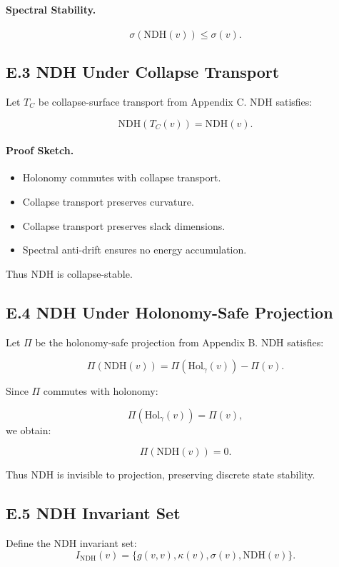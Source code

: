 \paragraph{Spectral Stability.}
\[
\sigma(\mathrm{NDH}(v)) \le \sigma(v).
\]

\subsection{E.3 NDH Under Collapse Transport}

Let $T_C$ be collapse-surface transport from Appendix C. NDH satisfies:

\[
\mathrm{NDH}(T_C(v)) = \mathrm{NDH}(v).
\]

\paragraph{Proof Sketch.}
\begin{itemize}
    \item Holonomy commutes with collapse transport.
    \item Collapse transport preserves curvature.
    \item Collapse transport preserves slack dimensions.
    \item Spectral anti-drift ensures no energy accumulation.
\end{itemize}

Thus NDH is collapse-stable.

\subsection{E.4 NDH Under Holonomy-Safe Projection}

Let $\Pi$ be the holonomy-safe projection from Appendix B. NDH satisfies:

\[
\Pi(\mathrm{NDH}(v)) = \Pi(\mathrm{Hol}_\gamma(v)) - \Pi(v).
\]

Since $\Pi$ commutes with holonomy:

\[
\Pi(\mathrm{Hol}_\gamma(v)) = \Pi(v),
\]
we obtain:

\[
\Pi(\mathrm{NDH}(v)) = 0.
\]

Thus NDH is invisible to projection, preserving discrete state stability.

\subsection{E.5 NDH Invariant Set}

Define the NDH invariant set:
\[
I_{\mathrm{NDH}}(v) = \{ g(v,v), \kappa(v), \sigma(v), \mathrm{NDH}(v) \}.
\]


